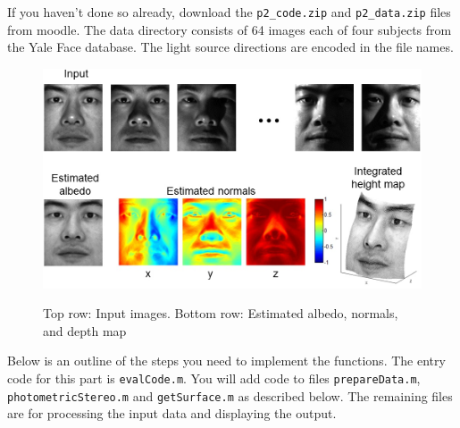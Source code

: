 \documentclass[10pt,letterpaper]{article}
\newcommand{\cmd}[1] {{\color{blue}\texttt{#1}}}
\begin{document}
If you haven't done so already, download the \cmd{p2\_code.zip} and \cmd{p2\_data.zip} files from moodle. The data directory consists of 64 images each of four subjects from the Yale Face database. The light source directions are encoded in the file names. 


\begin{figure}[h]
\centering
\includegraphics[width=0.85\linewidth]{./fig/shape_from_shading.jpg} \\
\caption{\label{fig:photometric-stereo} Top row: Input images. Bottom row: Estimated albedo, normals, and depth map}
\end{figure}


Below is an outline of the steps you need to implement the functions. The entry code for this part is \cmd{evalCode.m}. You will add code to files \cmd{prepareData.m}, \cmd{photometricStereo.m} and \cmd{getSurface.m} as described below. The remaining files are for processing the input data and displaying the output.
\end{document}
